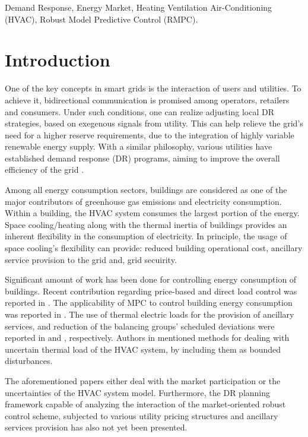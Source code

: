 \documentclass[conference,10pt]{IEEEtran}
\begin{document}
\begin{IEEEkeywords}
Demand Response, Energy Market, Heating Ventilation Air-Conditioning (HVAC), Robust Model Predictive Control (RMPC).
\end{IEEEkeywords}

\section{Introduction}
One of the key concepts in smart grids is the interaction of users and utilities. To achieve it, bidirectional communication is promised among operators, retailers and consumers. Under such conditions, one can realize adjusting local DR strategies, based on exegenous signals from utility. This can help relieve the grid's need for a higher reserve requirements, due to the integration of highly variable renewable energy supply. With a similar philosophy, various utilities have established demand response (DR) programs, aiming to improve the overall efficiency of the grid \cite{DRprog1, DRprog2, EMADR, EMAIL}. 

Among all energy consumption sectors, buildings are considered as one of the major contributors of greenhouse gas emissions and electricity consumption. Within a building, the HVAC system consumes the largest portion of the energy. Space cooling/heating along with the thermal inertia of buildings provides an inherent flexibility in the consumption of electricity. In principle, the usage of space cooling's flexibility can provide:  reduced building operational cost,  ancillary service provision to the grid and,  grid secuirity.

Significant amount of work has been done for controlling energy consumption of buildings. Recent contribution regarding price-based and direct load control was reported in \cite{Vrettosa}. The applicability of MPC to control building energy consumption was reported in \cite{Olde, YMa, Mehdi4}. The use of thermal electric loads for the provision of ancillary services, and reduction of the balancing groups' scheduled deviations were reported in \cite{Vrettosb} and \cite{Vrettosd}, respectively. Authors in \cite{Mehdi5} mentioned methods for dealing with uncertain thermal load of the HVAC system, by including them as bounded disturbances.

The aforementioned papers either deal with the market participation or the uncertainties of the HVAC system model. Furthermore, the DR planning framework capable of analyzing the interaction of the market-oriented robust control scheme, subjected to various utility pricing structures and ancillary services provision has also not yet been presented.
\end{document}

